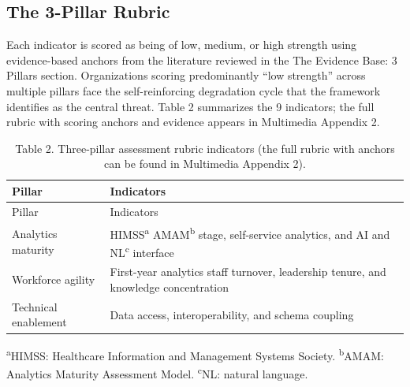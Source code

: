 \documentclass[
  american,
  11pt,
  letterpaper,
  oneside  ,captions=tableheading
]{scrartcl}
\begin{document}
\subsection{The 3-Pillar Rubric}\label{the-3-pillar-rubric}

Each indicator is scored as being of low, medium, or high strength using
evidence-based anchors from the literature reviewed in the The Evidence
Base: 3 Pillars section. Organizations scoring predominantly ``low
strength'' across multiple pillars face the self-reinforcing degradation
cycle that the framework identifies as the central threat. Table 2
summarizes the 9 indicators; the full rubric with scoring anchors and
evidence appears in Multimedia Appendix 2.

\begin{longtable}[]{@{}
  >{\raggedright\arraybackslash}p{}
  >{\raggedright\arraybackslash}p{}@{}}
\caption{Table 2. Three-pillar assessment rubric indicators (the full
rubric with anchors can be found in Multimedia Appendix 2).
\label{tab:rubric}}\tabularnewline
\toprule\noalign{}
\begin{minipage}[b]{\linewidth}\raggedright
Pillar
\end{minipage} & \begin{minipage}[b]{\linewidth}\raggedright
Indicators
\end{minipage} \\
\midrule\noalign{}
\endfirsthead
\toprule\noalign{}
\begin{minipage}[b]{\linewidth}\raggedright
Pillar
\end{minipage} & \begin{minipage}[b]{\linewidth}\raggedright
Indicators
\end{minipage} \\
\midrule\noalign{}
\endhead
\bottomrule\noalign{}
\endlastfoot
Analytics maturity & HIMSS\textsuperscript{a} AMAM\textsuperscript{b}
stage, self-service analytics, and AI and NL\textsuperscript{c}
interface \\
Workforce agility & First-year analytics staff turnover, leadership
tenure, and knowledge concentration \\
Technical enablement & Data access, interoperability, and schema
coupling \\
\end{longtable}

\textsuperscript{a}HIMSS: Healthcare Information and Management Systems
Society. \textsuperscript{b}AMAM: Analytics Maturity Assessment Model.
\textsuperscript{c}NL: natural language.
\end{document}
